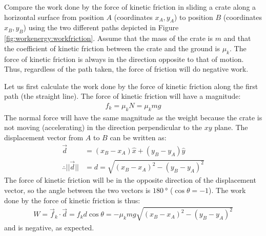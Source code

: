 \begin{example}{\label{ex:workenergy:workfriction}
Compare the work done by the force of kinetic friction in sliding a crate along a horizontal surface from position $A$ (coordinates $x_A, y_A$) to position $B$ (coordinates $x_B, y_B$) using the two different paths depicted in Figure \ref{fig:workenergy:workfriction}. Assume that the mass of the crate is $m$ and that the coefficient of kinetic friction between the crate and the ground is $\mu_k$.
}
The force of kinetic friction is always in the direction opposite to that of motion. Thus, regardless of the path taken, the force of friction will do negative work. 

Let us first calculate the work done by the force of kinetic friction along the first path (the straight line). The force of kinetic friction will have a magnitude:
\begin{align*}
f_k = \mu_k N = \mu_k mg
\end{align*}
The normal force will have the same magnitude as the weight because the crate is not moving (accelerating) in the direction perpendicular to the $xy$ plane.  The displacement vector from $A$ to $B$ can be written as:
\begin{align*}
\vec d &= (x_B-x_A)\hat x + (y_B-y_A) \hat y\\
\therefore ||\vec d|| &=d= \sqrt{(x_B-x_A)^2 - (y_B-y_A)^2}
\end{align*}  
The force of kinetic friction will be in the opposite direction of the displacement vector, so the angle between the two vectors is $\SI{180}{\degree}$ ($\cos\theta=-1$). The work done by the force of kinetic friction is thus:
\begin{align*}
W = \vec f_k \cdot\vec d = f_k d \cos\theta = -\mu_k mg\sqrt{(x_B-x_A)^2 - (y_B-y_A)^2}
\end{align*}
and is negative, as expected.


\end{example}

